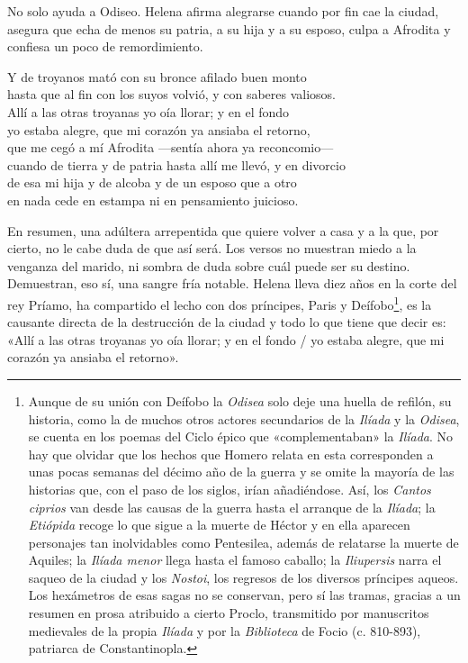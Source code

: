 No solo ayuda a Odiseo. Helena afirma alegrarse cuando por fin cae la ciudad, asegura que echa de menos su patria, a su hija y a su esposo, culpa a Afrodita y confiesa un poco de remordimiento.

\begin{versocita}
Y de troyanos mató con su bronce afilado buen monto\\
hasta que al fin con los suyos volvió, y con saberes valiosos.\\
Allí a las otras troyanas yo oía llorar; y en el fondo\\
yo estaba alegre, que mi corazón ya ansiaba el retorno,\\
que me cegó a mí Afrodita ---sentía ahora ya reconcomio---\\
cuando de tierra y de patria hasta allí me llevó, y en divorcio\\
de esa mi hija y de alcoba y de un esposo que a otro\\
en nada cede en estampa ni en pensamiento juicioso.
\end{versocita}

En resumen, una adúltera arrepentida que quiere volver a casa y a la que, por cierto, no le cabe duda de que así será. Los versos no muestran miedo a la venganza del marido, ni sombra de duda sobre cuál puede ser su destino. Demuestran, eso sí, una sangre fría notable. Helena lleva diez años en la corte del rey Príamo, ha compartido el lecho con dos príncipes, Paris y Deífobo\footnote{Aunque de su unión con Deífobo la \emph{Odisea} solo deje una huella de refilón, su historia, como la de muchos otros actores secundarios de la \emph{Ilíada} y la \emph{Odisea}, se cuenta en los poemas del Ciclo épico que «complementaban» la \emph{Ilíada}. No hay que olvidar que los hechos que Homero relata en esta corresponden a unas pocas semanas del décimo año de la guerra y se omite la mayoría de las historias que, con el paso de los siglos, irían añadiéndose. Así, los \emph{Cantos ciprios} van desde las causas de la guerra hasta el arranque de la \emph{Ilíada}; la \emph{Etiópida} recoge lo que sigue a la muerte de Héctor y en ella aparecen personajes tan inolvidables como Pentesilea, además de relatarse la muerte de Aquiles; la \emph{Ilíada menor} llega hasta el famoso caballo; la \emph{Iliupersis} narra el saqueo de la ciudad y los \emph{Nostoi}, los regresos de los diversos príncipes aqueos. Los hexámetros de esas sagas no se conservan, pero sí las tramas, gracias a un resumen en prosa atribuido a cierto Proclo, transmitido por manuscritos medievales de la propia \emph{Ilíada} y por la \emph{Biblioteca} de Focio (c. 810-893), patriarca de Constantinopla.}, es la causante directa de la destrucción de la ciudad y todo lo que tiene que decir es: «Allí a las otras troyanas yo oía llorar; y en el fondo / yo estaba alegre, que mi corazón ya ansiaba el retorno».


